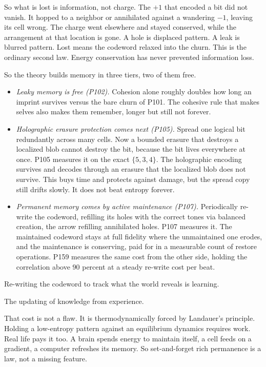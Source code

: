 So what is lost is information, not charge. The $+1$ that encoded a bit did not vanish. It hopped to a neighbor or annihilated against a wandering $-1$, leaving its cell wrong. The charge went elsewhere and stayed conserved, while the arrangement at that location is gone. A hole is displaced pattern. A leak is blurred pattern. Lost means the codeword relaxed into the churn. This is the ordinary second law. Energy conservation has never prevented information loss.

So the theory builds memory in three tiers, two of them free.

\begin{itemize}
\item \emph{Leaky memory is free (P102).} Cohesion alone roughly doubles how long an imprint survives versus the bare churn of P101. The cohesive rule that makes selves also makes them remember, longer but still not forever.

\item \emph{Holographic erasure protection comes next (P105).} Spread one logical bit redundantly across many cells. Now a bounded erasure that destroys a localized blob cannot destroy the bit, because the bit lives everywhere at once. P105 measures it on the exact $\{5,3,4\}$. The holographic encoding survives and decodes through an erasure that the localized blob does not survive. This buys time and protects against damage, but the spread copy still drifts slowly. It does not beat entropy forever.

\item \emph{Permanent memory comes by active maintenance (P107).} Periodically re-write the codeword, refilling its holes with the correct tones via balanced creation, the arrow refilling annihilated holes. P107 measures it. The maintained codeword stays at full fidelity where the unmaintained one erodes, and the maintenance is conserving, paid for in a measurable count of restore operations. P159 measures the same cost from the other side, holding the correlation above $90$ percent at a steady re-write cost per beat.
\end{itemize}

Re-writing the codeword to track what the world reveals is learning.

\begin{definition}[Learning]
The updating of knowledge from experience.
\end{definition}

That cost is not a flaw. It is thermodynamically forced by Landauer's principle. Holding a low-entropy pattern against an equilibrium dynamics requires work. Real life pays it too. A brain spends energy to maintain itself, a cell feeds on a gradient, a computer refreshes its memory. So set-and-forget rich permanence is a law, not a missing feature.

